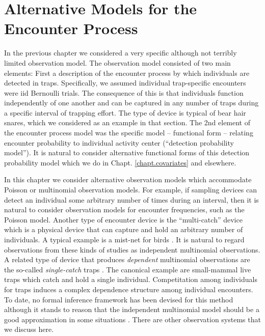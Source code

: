 \chapter{Alternative Models for the Encounter Process}
\label{chapt.poisson-mn}

In the previous chapter we considered a very specific although not
terribly limited observation model. The observation model consisted of
two main elements: First a description of the encounter process 
by which individuals are detected in traps. Specifically, we 
assumed individual trap-specific encounters were iid Bernoulli
trials. The consequence of this is that individuals function
independently of one another and can be captured in
any number of traps during a specific interval of trapping
effort. The type of device is typical of bear hair snares, which we
considered as an example in that section. The 2nd element of the
encounter process model was the specific model – functional form –
relating encounter probability to individual activity center
(``detection probability model'').  It is natural to consider
alternative functional forms of this detection probability model which
we do in Chapt. \ref{chapt.covariates} and elsewhere. 

In this chapter we consider alternative observation models which
accommodate Poisson or multinomial observation models. For example, if
sampling devices can detect an individual some arbitrary number of
times during an interval, then it is natural to consider observation
models for encounter frequencies, such as the Poisson model. Another
type of encounter device is the ``multi-catch'' device
\citep{efford_etal:2009euring} which 
is a physical device that can capture and hold an arbitrary number of
individuals. A typical example is a mist-net for birds 
\citep{borchers_efford:2008}.  It is natural to regard observations
from these kinds of studies as independent multinomial observations. 
A related type of device that produces {\it dependent} multinomial
observations are the so-called {\it single-catch} traps
\citep{efford_etal:2009euring}. The canonical example are small-mammal
live traps which catch and hold a single individual. Competitation
among individuals for traps induces a complex dependence structure
among individual encounters. To date, no formal inference framework
has been devised for this method although it stands to reason that the
independent multinomial model should be a good approximation in some
situations \citep{efford_etal:2009euring}.  There are other
observation systems that we discuss here. 


